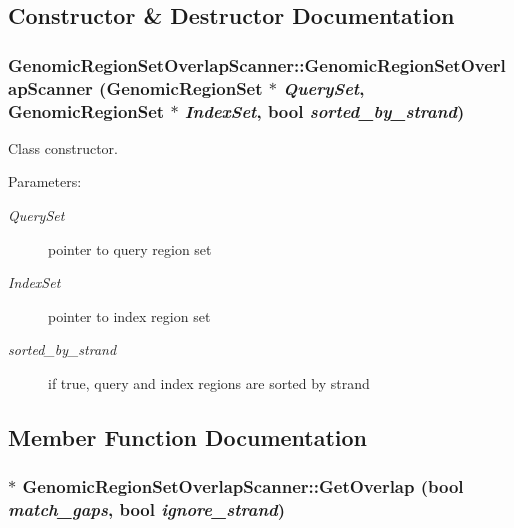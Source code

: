 

\subsection{Constructor \& Destructor Documentation}
\hypertarget{classGenomicRegionSetOverlapScanner_268a52207c12005452c46e86167e4faf}{
\subsubsection[GenomicRegionSetOverlapScanner]{\setlength{\rightskip}{0pt plus 5cm}GenomicRegionSetOverlapScanner::GenomicRegionSetOverlapScanner ({\bf GenomicRegionSet} $\ast$ {\em QuerySet}, \/  {\bf GenomicRegionSet} $\ast$ {\em IndexSet}, \/  bool {\em sorted\_\-by\_\-strand})}}
\label{classGenomicRegionSetOverlapScanner_268a52207c12005452c46e86167e4faf}


Class constructor. 

\begin{Desc}
\item[Parameters:]
\begin{description}
\item[{\em QuerySet}]pointer to query region set \item[{\em IndexSet}]pointer to index region set \item[{\em sorted\_\-by\_\-strand}]if true, query and index regions are sorted by strand \end{description}
\end{Desc}


\subsection{Member Function Documentation}
\hypertarget{classGenomicRegionSetOverlapScanner_63d7837172475b7c75d1b5b28a4bca97}{
\subsubsection[GetOverlap]{ $\ast$ GenomicRegionSetOverlapScanner::GetOverlap (bool {\em match\_\-gaps}, \/  bool {\em ignore\_\-strand})}}
\label{classGenomicRegionSetOverlapScanner_63d7837172475b7c75d1b5b28a4bca97}


